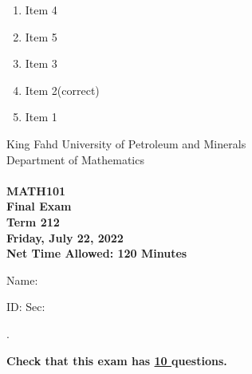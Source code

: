\documentclass[amsfonts,bezier,leqno,fleqn,12pt,a4paper]{article}
\begin{document}
{{\begin{large}
\begin{enumerate}
\begin{enumerate}
\item  Item 4
\item  Item 5
\item  Item 3
\item  Item 2\hfill {\small (correct)}
\item  Item 1

\end{enumerate}
\newpage


\end{enumerate}
\end{large}


\newpage


\thispagestyle{empty}
\begin{center}
    \begin{large}
        King Fahd University of Petroleum and Minerals \\ 
        Department of Mathematics  \\ 
        \vspace*{4.5cm}
        {\bf {} }  \hfill {\bf {}} \\
        {\bf MATH101 }  \\
        {\bf Final Exam }  \\
        {\bf Term 212 }  \\
        {\bf Friday, July 22, 2022 }  \\ 
        {\bf Net Time Allowed: 120 Minutes }  \\
        \vspace*{0.2cm}

    \end{large}
\end{center}

\large{Name:  }\hrulefill

\vspace{3mm}

\large{ID: } \hrulefill \large{  Sec: } \hrulefill \large{.

\vspace{1cm}

\large{\bf{Check that this exam has {\underline{ 10 }} questions.}}

\vspace{1cm}

}}}
\end{document}
